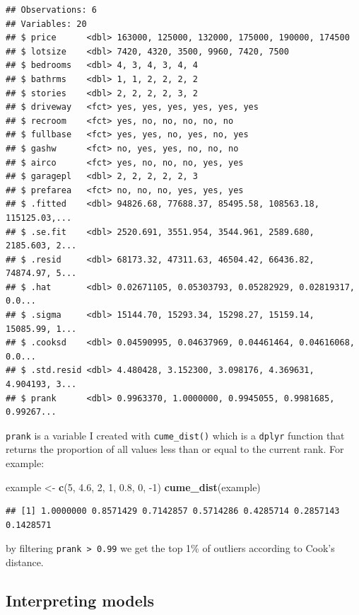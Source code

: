 \documentclass[]{gitbook}
\newenvironment{Shaded}{\begin{snugshade}}{\end{snugshade}}
\newcommand{\DecValTok}[1]{\textcolor[rgb]{0.00,0.00,0.81}{#1}}
\newcommand{\FloatTok}[1]{\textcolor[rgb]{0.00,0.00,0.81}{#1}}
\newcommand{\KeywordTok}[1]{\textcolor[rgb]{0.13,0.29,0.53}{\textbf{#1}}}
\newcommand{\NormalTok}[1]{#1}
\newcommand{\StringTok}[1]{\textcolor[rgb]{0.31,0.60,0.02}{#1}}
\theoremstyle{definition}
\theoremstyle{definition}
\theoremstyle{definition}
\theoremstyle{remark}
\begin{document}
\begin{verbatim}
## Observations: 6
## Variables: 20
## $ price      <dbl> 163000, 125000, 132000, 175000, 190000, 174500
## $ lotsize    <dbl> 7420, 4320, 3500, 9960, 7420, 7500
## $ bedrooms   <dbl> 4, 3, 4, 3, 4, 4
## $ bathrms    <dbl> 1, 1, 2, 2, 2, 2
## $ stories    <dbl> 2, 2, 2, 2, 3, 2
## $ driveway   <fct> yes, yes, yes, yes, yes, yes
## $ recroom    <fct> yes, no, no, no, no, no
## $ fullbase   <fct> yes, yes, no, yes, no, yes
## $ gashw      <fct> no, yes, yes, no, no, no
## $ airco      <fct> yes, no, no, no, yes, yes
## $ garagepl   <dbl> 2, 2, 2, 2, 2, 3
## $ prefarea   <fct> no, no, no, yes, yes, yes
## $ .fitted    <dbl> 94826.68, 77688.37, 85495.58, 108563.18, 115125.03,...
## $ .se.fit    <dbl> 2520.691, 3551.954, 3544.961, 2589.680, 2185.603, 2...
## $ .resid     <dbl> 68173.32, 47311.63, 46504.42, 66436.82, 74874.97, 5...
## $ .hat       <dbl> 0.02671105, 0.05303793, 0.05282929, 0.02819317, 0.0...
## $ .sigma     <dbl> 15144.70, 15293.34, 15298.27, 15159.14, 15085.99, 1...
## $ .cooksd    <dbl> 0.04590995, 0.04637969, 0.04461464, 0.04616068, 0.0...
## $ .std.resid <dbl> 4.480428, 3.152300, 3.098176, 4.369631, 4.904193, 3...
## $ prank      <dbl> 0.9963370, 1.0000000, 0.9945055, 0.9981685, 0.99267...
\end{verbatim}

\texttt{prank} is a variable I created with \texttt{cume\_dist()} which
is a \texttt{dplyr} function that returns the proportion of all values
less than or equal to the current rank. For example:

\begin{Shaded}
\begin{Highlighting}[]
\NormalTok{example <-}\StringTok{ }\KeywordTok{c}\NormalTok{(}\DecValTok{5}\NormalTok{, }\FloatTok{4.6}\NormalTok{, }\DecValTok{2}\NormalTok{, }\DecValTok{1}\NormalTok{, }\FloatTok{0.8}\NormalTok{, }\DecValTok{0}\NormalTok{, }\DecValTok{-1}\NormalTok{)}
\KeywordTok{cume_dist}\NormalTok{(example)}
\end{Highlighting}
\end{Shaded}

\begin{verbatim}
## [1] 1.0000000 0.8571429 0.7142857 0.5714286 0.4285714 0.2857143 0.1428571
\end{verbatim}

by filtering \texttt{prank\ \textgreater{}\ 0.99} we get the top 1\% of
outliers according to Cook's distance.

\hypertarget{interpreting-models}{%
\subsection{Interpreting models}\label{interpreting-models}}
\end{document}
